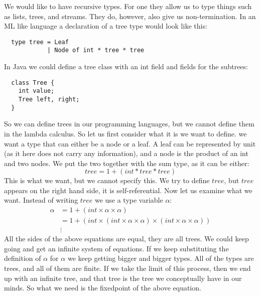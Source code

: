 We would like to have recursive types. For one they allow us to type things such as lists, trees, and streams. They do, however, also give us non-termination. In an ML like language a declaration of a tree type would look like this:
\begin{lstlisting}
  type tree = Leaf
            | Node of int * tree * tree
\end{lstlisting}
In Java we could define a tree class with an int field and fields for the subtrees:
\begin{lstlisting}
  class Tree {
    int value;
    Tree left, right;
  }
\end{lstlisting}
So we can define trees in our programming languages, but we cannot define them in the lambda calculus. So let us first consider what it is we want to define. we want a type that can either be a node or a leaf. A leaf can be represented by unit (as it here does not carry any information), and a node is the product of an int and two nodes. We put the two together with the sum type, as it can be either:
\[
  tree = 1 + (int * tree * tree)
\]
This is what we want, but we cannot specify this. We try to define $tree$, but $tree$ appears on the right hand side, it is self-referential. Now let us examine what we want. Instead of writing $tree$ we use a type variable $\alpha$:
\begin{align*}
  \alpha &= 1 + (int \times \alpha \times \alpha) \\
         &= 1 + (int \times (int \times \alpha \times \alpha) \times (int \times \alpha \times \alpha)) \\
  &\vdots
\end{align*}
All the sides of the above equations are equal, they are all trees. We could keep going and get an infinite system of equations. If we keep substituting the definition of $\alpha$ for $\alpha$ we keep getting bigger and bigger types. All of the types are trees, and all of them are finite. If we take the limit of this process, then we end up with an infinite tree, and that tree is the tree we conceptually have in our minds. So what we need is the fixedpoint of the above equation.

